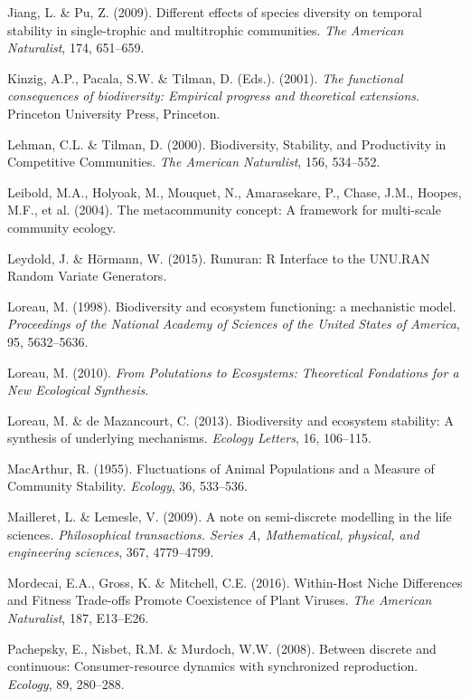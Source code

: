 \documentclass[12pt,]{article}
\begin{document}
\hypertarget{ref-Jiang2009}{}
Jiang, L. \& Pu, Z. (2009). Different effects of species diversity on
temporal stability in single-trophic and multitrophic communities.
\emph{The American Naturalist}, 174, 651--659.

\hypertarget{ref-Kinzig2001}{}
Kinzig, A.P., Pacala, S.W. \& Tilman, D. (Eds.). (2001). \emph{The
functional consequences of biodiversity: Empirical progress and
theoretical extensions}. Princeton University Press, Princeton.

\hypertarget{ref-Lehman2000}{}
Lehman, C.L. \& Tilman, D. (2000). Biodiversity, Stability, and
Productivity in Competitive Communities. \emph{The American Naturalist},
156, 534--552.

\hypertarget{ref-Leibold2004}{}
Leibold, M.A., Holyoak, M., Mouquet, N., Amarasekare, P., Chase, J.M.,
Hoopes, M.F., et al. (2004). The metacommunity concept: A framework for
multi-scale community ecology.

\hypertarget{ref-Leydold2015}{}
Leydold, J. \& Hörmann, W. (2015). Runuran: R Interface to the UNU.RAN
Random Variate Generators.

\hypertarget{ref-Loreau1998}{}
Loreau, M. (1998). Biodiversity and ecosystem functioning: a mechanistic
model. \emph{Proceedings of the National Academy of Sciences of the
United States of America}, 95, 5632--5636.

\hypertarget{ref-Loreau2010}{}
Loreau, M. (2010). \emph{From Polutations to Ecosystems: Theoretical
Fondations for a New Ecological Synthesis}.

\hypertarget{ref-Loreau2013}{}
Loreau, M. \& de Mazancourt, C. (2013). Biodiversity and ecosystem
stability: A synthesis of underlying mechanisms. \emph{Ecology Letters},
16, 106--115.

\hypertarget{ref-MacArthur1955}{}
MacArthur, R. (1955). Fluctuations of Animal Populations and a Measure
of Community Stability. \emph{Ecology}, 36, 533--536.

\hypertarget{ref-Mailleret2009}{}
Mailleret, L. \& Lemesle, V. (2009). A note on semi-discrete modelling
in the life sciences. \emph{Philosophical transactions. Series A,
Mathematical, physical, and engineering sciences}, 367, 4779--4799.

\hypertarget{ref-Mordecai2016}{}
Mordecai, E.A., Gross, K. \& Mitchell, C.E. (2016). Within-Host Niche
Differences and Fitness Trade-offs Promote Coexistence of Plant Viruses.
\emph{The American Naturalist}, 187, E13--E26.

\hypertarget{ref-Pachepsky2008}{}
Pachepsky, E., Nisbet, R.M. \& Murdoch, W.W. (2008). Between discrete
and continuous: Consumer-resource dynamics with synchronized
reproduction. \emph{Ecology}, 89, 280--288.
\end{document}
